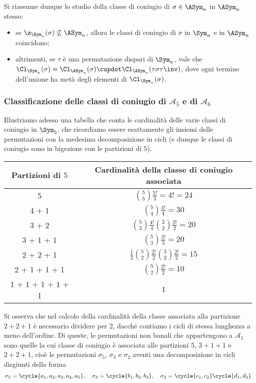 \documentclass[11pt]{scrartcl}
\begin{document}
	
	Si riassume dunque lo studio della classe di coniugio di $\sigma \in \ASym_n$ in $\ASym_n$ stesso:
	\begin{itemize}
		\item se $\z_{\Sym_n}(\sigma) \not\subseteq \ASym_n$, allora le classi di coniugio di
		$\sigma$ in $\Sym_n$ e in $\ASym_n$ coincidono;
		\item altrimenti, se $\tau$ è una permutazione dispari di $\Sym_n$, vale
		che $\Cl_{\Sym_n}(\sigma) = \Cl_{\ASym_n}(\sigma) \cupdot \Cl_{\ASym_n}(\tau\sigma\tau\inv)$, dove ogni termine dell'unione ha metà degli
		elementi di $\Cl_{\Sym_n}(\sigma)$.
		
	\end{itemize}
	
	\subsubsection{Classificazione delle classi di coniugio di \texorpdfstring{$\mathcal{A}_5$}{A₅} e di \texorpdfstring{$\mathcal{A}_6$}{A₆}}
	
	Illustriamo adesso una tabella che conta le cardinalità delle varie classi di coniugio
	in $\Sym_5$, che ricordiamo essere esattamente gli insiemi delle permutazioni con
	la medesima decomposizione in cicli (e dunque le classi di coniugio sono in bigezione
	con le partizioni di $5$).
	\begingroup
	\renewcommand{\arraystretch}{2}
	\begin{center}
		\begin{tabular}{c|c}
			Partizioni di $5$ & Cardinalità della classe di coniugio associata\\
			\hline
			5 & $\binom{5}{5} \frac{5!}{5} = 4! = 24$\\
			4 + 1 & $\binom{5}{4} \frac{4!}{4} = 30$\\
			3 + 2 & $\binom{5}{3} \frac{4!}{4} \binom{2}{2} \frac{2!}{2} = 20$\\
			3 + 1 + 1 & $\binom{5}{3} \frac{3!}{3} = 20$\\
			2 + 2 + 1 & $\frac 1 2\binom{5}{2} \frac{2!}{2} \binom{3}{2} \frac{2!}{2} = 15$\\
			2 + 1 + 1 + 1 & $\binom{5}{2} \frac{2!}{2} = 10$\\
			1 + 1 + 1 + 1 + 1 & $1$
		\end{tabular}
	\end{center}
	\endgroup
	Si osserva che nel calcolo della cardinalità della classe associata
	alla partizione $2 + 2 + 1$ è necessario dividere per $2$, dacché contiamo i cicli di
	stessa lunghezza a meno dell'ordine.
	Di queste, le permutazioni non banali che appartengono a $\mathcal{A}_5$ sono quelle
	la cui classe di coniugio è associata alle partizioni $5$, $3 + 1 + 1$ e
	$2 + 2 + 1$, cioè le permutazioni $\sigma_5$, $\sigma_3$ e $\sigma_2$
	aventi una decomposizione in cicli disgiunti della forma
	\[
	\sigma_5 = \cycle{a_1, a_2, a_3, a_4, a_5}, \quad \sigma_3 = \cycle{b_1, b_2, b_3}, \quad \sigma_2 = \cycle{c_1, c_2}\cycle{d_1, d_2}
	\]
	
\end{document}
